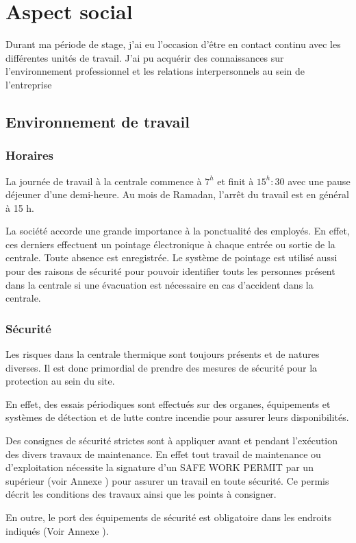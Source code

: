 \chapter{Aspect social}
Durant ma période de stage, j'ai eu l'occasion d'être en contact continu avec les différentes unités de travail. J'ai pu acquérir des connaissances sur l'environnement professionnel et les relations interpersonnels au sein de l'entreprise
\section{Environnement de travail}
\subsection{Horaires}
La journée de travail à la centrale  commence à $7^h$ et finit à $15^h:30$ avec une pause déjeuner d'une demi-heure. Au mois de Ramadan, l'arrêt du travail est en général à 15 h.

La société accorde une grande importance à la ponctualité des employés. En effet, ces derniers effectuent un pointage électronique à chaque entrée ou sortie de la centrale. Toute absence est enregistrée. Le système de pointage est utilisé aussi pour des raisons de sécurité pour pouvoir identifier touts les personnes présent dans la centrale si une évacuation est nécessaire en cas d'accident dans la centrale.
\subsection{Sécurité}
Les risques dans la centrale thermique sont toujours présents et de natures diverses.
Il est donc primordial de prendre des mesures de sécurité pour la protection au sein du site.

En effet, des essais périodiques sont effectués sur  des organes, équipements et systèmes de détection et de lutte contre incendie  pour assurer leurs disponibilités.

Des consignes de sécurité strictes sont à appliquer avant et pendant l'exécution des divers travaux de maintenance. En effet tout travail de maintenance ou d'exploitation nécessite la signature d'un SAFE WORK PERMIT par un supérieur  (voir Annexe \uppercase\expandafter{}) pour assurer un travail en toute sécurité. Ce permis décrit les conditions des travaux ainsi que les points à consigner.

En outre, le port des équipements de sécurité est obligatoire dans les endroits indiqués (Voir Annexe \uppercase\expandafter{}).

